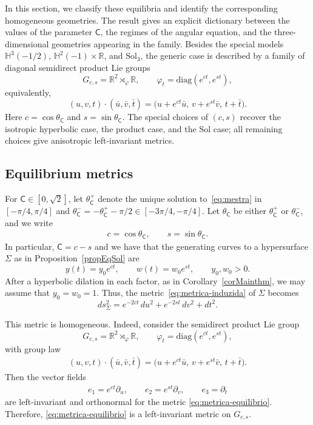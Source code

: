 \documentclass[11pt,a4paper]{amsart}
\renewcommand{\S}{\Sigma}
\theoremstyle{plain}
\theoremstyle{remark}
\newcommand{\R}{\mathbb{R}}
\newcommand{\Hyp}{\mathbb{H}}
\newcommand{\C}{\mathsf{C}}
\begin{document}
In this section, we classify these equilibria and identify the corresponding
homogeneous geometries. The result gives an explicit dictionary between the
values of the parameter $\C$, the regimes of the angular equation, and the
three-dimensional geometries appearing in the family. Besides the special
models $\Hyp^3(-1/2)$, $\Hyp^2(-1)\times\R$, and ${\mathrm{Sol}}_3$, the generic case is described by a family of diagonal semidirect product Lie groups
\[
G_{c,s}=\R^2\rtimes_{\varphi}\R,
\qquad
\varphi_t=\mathrm{diag}(e^{ct},e^{st}),
\]
equivalently,
\[
(u,v,t)\cdot(\bar u,\bar v,\bar t)
=
\bigl(u+e^{ct}\bar u,\,
v+e^{st}\bar v,\,
t+\bar t\bigr).
\]
Here $c=\cos\theta_\C$ and $s=\sin\theta_\C$. The special choices of
$(c,s)$ recover the isotropic hyperbolic case, the product case, and the
Sol case; all remaining choices give anisotropic left-invariant
metrics.


\subsection{Equilibrium metrics}
\label{subsec:metricas-equilibrio}

For $\C\in[0,\sqrt{2}]$, let
$\theta_\C^+$ denote the unique solution to~\eqref{eq:mestra} in
$[-\pi/4,\pi/4]$ and 
$\theta_\C^- = -\theta^+_\C-\pi/2\in [-3\pi/4,-\pi/4]$. Let
$\theta_\C$ be either $\theta_\C^+$ or $\theta_\C^-$, and we write
\begin{align*}
c=\cos\theta_\C, \qquad s=\sin\theta_\C.
\end{align*}
In particular, $\C=c-s$ and we have that the generating curves to 
a hypersurface $\S$ as in Proposition~\ref{propEqSol} are
\begin{equation}\label{eq:eq-yw}
y(t)=y_0e^{ct}, \qquad w(t)=w_0e^{st}, \qquad y_0,w_0>0.
\end{equation}
After a hyperbolic dilation in each factor, as in 
Corollary~\ref{corMainthm}, we may assume that
$y_0=w_0=1$. Thus, the metric~\eqref{eq:metrica-induzida} of $\S$
becomes
\begin{equation}\label{eq:metrica-equilibrio}
\boxed{\;
ds_\Sigma^2
=e^{-2ct}\,du^2+e^{-2st}\,dv^2+dt^2.
\;}
\end{equation}



This metric is homogeneous. Indeed, consider the semidirect product Lie group
\[
G_{c,s}=\R^2\rtimes_{\varphi}\R,
\qquad
\varphi_t=\mathrm{diag}(e^{ct},e^{st}),
\]
with group law
\begin{align*}
(u,v,t)\cdot(\bar u,\bar v,\bar t)
=
\bigl(u+e^{ct}\bar u,\, v+e^{st}\bar v,\, t+\bar t\bigr).
\end{align*}
Then the vector fields
\begin{align*}
e_1=e^{ct}\partial_u, \qquad e_2=e^{st}\partial_v, \qquad e_3=\partial_t
\end{align*}
are left-invariant and orthonormal for the metric \eqref{eq:metrica-equilibrio}. 
Therefore, \eqref{eq:metrica-equilibrio} is a left-invariant metric on $G_{c,s}$.
\end{document}
